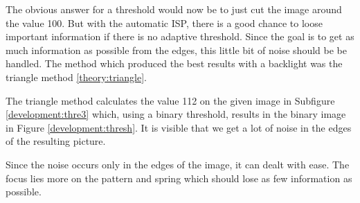 The obvious answer for a threshold would now be to just cut the image around the value 100.
But with the automatic \acs{ISP}, there is a good chance to loose important information if there is no adaptive threshold.
Since the goal is to get as much information as possible from the edges, this little bit of noise should be be handled.
The method which produced the best results with a backlight was the triangle method \ref{theory:triangle}.

The triangle method calculates the value 112 on the given image in Subfigure \ref{development:thre3} which, using a binary threshold, results in the binary image in Figure \ref{development:thresh}.
It is visible that we get a lot of noise in the edges of the resulting picture.
\begin{center}
	\centering
	\label{development:thresh}
\end{center}
Since the noise occurs only in the edges of the image, it can dealt with ease.
The focus lies more on the pattern and spring which should lose as few information as possible.

